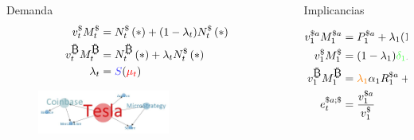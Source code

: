 \begin{frame}
\begin{columns}
\begin{column}{0.50\textwidth}
    
    \begin{block}{Demanda}
        \vspace{-10pt}
            \tiny
              \begin{align*}
              v_{t}^{\$}{M_{t}^{\$}}&={N_{t}^{\$}\left(*\right)}+(1-\lambda_t){N_{t}^{\$}\left(*\right)}\\
              v_{t}^{\bitcoinA}{M_{t}^{\bitcoinA}}&={N_{t}^{\bitcoinA}\left(*\right)+\lambda_tN_{t}^{\$}\left(*\right)}\\
              \lambda_t&=\textcolor{blue!70}{S}(\textcolor{red}{\mu_t})
            \end{align*}
    \vspace{-20pt}
            \begin{figure}[t!]
            \begin{center}
            \includegraphics[width=0.6\textwidth]{images/C3/c3_simul_influ3.jpg}
             \end{center}
            \end{figure}
            
    \end{block}
    \end{column}
    
    \begin{column}{0.55\textwidth}
    
    \begin{block}{Implicancias}
    \tiny

    \begin{align*}
    v^{\$a}_1 M^{\$a}_1&=P_1^{{\$a}} + \lambda_1 (1-\alpha_1) R_1^{{\$a}} + (1-\lambda_1) \textcolor{blue!60}{\rho_1}  R_1^{{\$a}}\\
    v_1^{\$} M_1^{\$}&=(1-\lambda_1) \textcolor{green!70}{\delta_1} R_1^{\$a}\\
    v_1^{\bitcoinA} M_1^{\bitcoinA}&=\textcolor{orange}{\lambda_1}  \alpha_1 R_1^{\$a} + (1-\lambda_1) \textcolor{red}{\beta_1} R_1^{\$a}\\
    e_t^{{\$a};{\$}}&=\frac{v_1^{\$a}}{v_1^{\$}}
    \end{align*}
    
    \vspace{-5pt}
    

\end{block}
\end{column}
\end{columns}
\end{frame}
